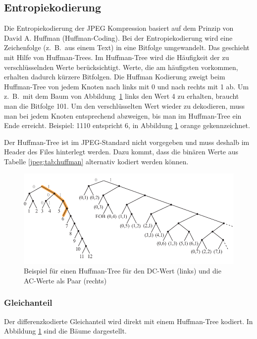 \subsection{Entropiekodierung
\label{jpeg:subsection:entropiekodierung}}
Die Entropiekodierung der JPEG Kompression basiert auf dem Prinzip von David A. Huffman (Huffman-Coding).
%
Bei der Entropiekodierung wird eine Zeichenfolge (z.~B.~aus einem Text) in eine Bitfolge umgewandelt.
Das geschieht mit Hilfe von Huffman-Trees.
Im Huffman-Tree wird die Häufig\-keit der zu verschlüsselnden Werte berücksichtigt.
Werte, die am häufigsten vorkommen, erhalten dadurch kürzere Bitfolgen.
Die Huffman Kodierung zweigt beim Huffman-Tree von jedem Knoten nach links mit 0 und nach rechts mit 1 ab.
Um z.~B.~mit dem Baum von Abbildung~\ref{jpeg:fig:huffman} links den Wert 4 zu erhalten, braucht man die Bitfolge 101.
Um den verschlüsselten Wert wieder zu dekodieren, muss man bei jedem Knoten entsprechend abzweigen, bis man im Huffman-Tree ein Ende erreicht. Beispiel: 1110 entspricht 6, in Abbildung \ref{jpeg:fig:huffman} orange gekennzeichnet.

Der Huffman-Tree ist im JPEG-Standard nicht vorgegeben und muss deshalb im Header des Files hinterlegt werden.
Dazu kommt, dass die binären Werte aus Tabelle \ref{jpeg:tab:huffman} alternativ kodiert werden können.

\begin{figure}
    \centering
    \includegraphics[width=\textwidth]{papers/jpeg/pictures/huffman.pdf}
    \caption{Beispiel für einen Huffman-Tree für den DC-Wert (links) \cite{jpeg:dccomponentyoutube} und die AC-Werte als Paar (rechts) \cite{jpeg:accomponentsyoutube}
        \label{jpeg:fig:huffman}}
\end{figure}

\subsubsection{Gleichanteil
\label{jpeg:subsubsection:gleichanteil}}
Der differenzkodierte Gleichanteil wird direkt mit einem Huffman-Tree kodiert.
%
In Abbildung \ref{jpeg:fig:huffman} sind die Bäume dargestellt.


